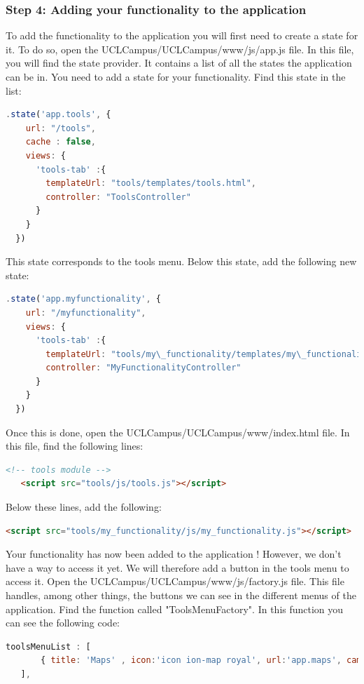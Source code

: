 \documentclass[11pt, a4paper]{report}
\begin{document}
\subsubsection{Step 4: Adding your functionality to the application}
To add the functionality to the application you will first need to create a state for it. To do so, open the UCLCampus/UCLCampus/www/js/app.js file. In this file, you will find the state provider. It contains a list of all the states the application can be in. You need to add a state for your functionality. Find this state in the list:
\begin{lstlisting}[language=JavaScript]
.state('app.tools', {
    url: "/tools",
    cache : false,
    views: {
      'tools-tab' :{
        templateUrl: "tools/templates/tools.html",
        controller: "ToolsController"
      }
    }
  })
\end{lstlisting} 
This state corresponds to the tools menu. Below this state, add the following new state:
\begin{lstlisting}[language=JavaScript]
.state('app.myfunctionality', {
    url: "/myfunctionality",
    views: {
      'tools-tab' :{
        templateUrl: "tools/my\_functionality/templates/my\_functionality.html",
        controller: "MyFunctionalityController"
      }
    }
  })
\end{lstlisting} 
Once this is done, open the UCLCampus/UCLCampus/www/index.html file. In this file, find the following lines:
\begin{lstlisting}[language=HTML]
   <!-- tools module -->
   <script src="tools/js/tools.js"></script>
\end{lstlisting}
Below these lines, add the following:
\begin{lstlisting}[language=HTML]
   <script src="tools/my_functionality/js/my_functionality.js"></script>
\end{lstlisting}
Your functionality has now been added to the application ! However, we don't have a way to access it yet. We will therefore add a button in the tools menu to access it. Open the UCLCampus/UCLCampus/www/js/factory.js file. This file handles, among other things, the buttons we can see in the different menus of the application. Find the function called "ToolsMenuFactory".  In this function you can see the following code:
\begin{lstlisting}[language=JavaScript]
   toolsMenuList : [
       { title: 'Maps' , icon:'icon ion-map royal', url:'app.maps', campus:['Louvain-la-Neuve']}
   ], 
\end{lstlisting}
\end{document}
